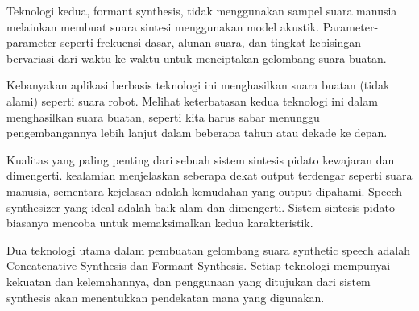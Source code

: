Teknologi kedua, formant synthesis, tidak menggunakan sampel suara manusia melainkan membuat suara sintesi menggunakan model akustik. Parameter-parameter seperti frekuensi dasar, alunan suara, dan tingkat kebisingan bervariasi dari waktu ke waktu untuk menciptakan gelombang suara buatan.

Kebanyakan aplikasi berbasis teknologi ini menghasilkan suara buatan (tidak alami) seperti suara robot. Melihat keterbatasan kedua teknologi ini dalam menghasilkan suara buatan, seperti kita harus sabar menunggu pengembangannya lebih lanjut dalam beberapa tahun atau dekade ke depan.

Kualitas yang paling penting dari sebuah sistem sintesis pidato kewajaran dan dimengerti. kealamian menjelaskan seberapa dekat output terdengar seperti suara manusia, sementara kejelasan adalah kemudahan yang output dipahami. Speech synthesizer yang ideal adalah baik alam dan dimengerti. Sistem sintesis pidato biasanya mencoba untuk memaksimalkan kedua karakteristik.

Dua teknologi utama dalam pembuatan gelombang suara synthetic speech adalah Concatenative Synthesis dan Formant Synthesis. Setiap teknologi mempunyai kekuatan dan kelemahannya, dan penggunaan yang ditujukan dari sistem synthesis akan menentukkan pendekatan mana yang digunakan.

